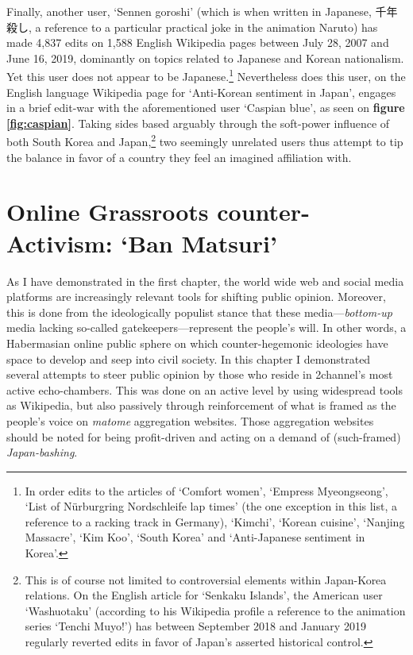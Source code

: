 \documentclass[10pt,british,A4paper,,openany]{memoir}
\begin{document}
Finally, another user, `Sennen goroshi' (which is when written in
Japanese, 千年殺し, a reference to a particular practical joke in the
animation Naruto) has made 4,837 edits on 1,588 English Wikipedia pages
between July 28, 2007 and June 16, 2019, dominantly on topics related to
Japanese and Korean nationalism. Yet this user does not appear to be
Japanese.\footnote{In order edits to the articles of `Comfort women',
  `Empress Myeongseong', `List of Nürburgring Nordschleife lap times'
  (the one exception in this list, a reference to a racking track in
  Germany), `Kimchi', `Korean cuisine', `Nanjing Massacre', `Kim Koo',
  `South Korea' and `Anti-Japanese sentiment in Korea'.} Nevertheless
does this user, on the English language Wikipedia page for `Anti-Korean
sentiment in Japan', engages in a brief edit-war with the aforementioned
user `Caspian blue', as seen on \textbf{figure \ref{fig:caspian}}.
Taking sides based arguably through the soft-power influence of both
South Korea and Japan,\footnote{This is of course not limited to
  controversial elements within Japan-Korea relations. On the English
  article for `Senkaku Islands', the American user `Washuotaku'
  (according to his Wikipedia profile a reference to the animation
  series `Tenchi Muyo!') has between September 2018 and January 2019
  regularly reverted edits in favor of Japan's asserted historical
  control.} two seemingly unrelated users thus attempt to tip the
balance in favor of a country they feel an imagined affiliation with.

\section{\texorpdfstring{Online Grassroots counter-Activism: `Ban
Matsuri'}{Online Grassroots counter-Activism: Ban Matsuri}}\label{online-grassroots-counter-activism-ban-matsuri}

As I have demonstrated in the first chapter, the world wide web and
social media platforms are increasingly relevant tools for shifting
public opinion. Moreover, this is done from the ideologically populist
stance that these media---\emph{bottom-up} media lacking so-called
gatekeepers---represent the people's will. In other words, a Habermasian
online public sphere on which counter-hegemonic ideologies have space to
develop and seep into civil society. In this chapter I demonstrated
several attempts to steer public opinion by those who reside in
2channel's most active echo-chambers. This was done on an active level
by using widespread tools as Wikipedia, but also passively through
reinforcement of what is framed as the people's voice on \emph{matome}
aggregation websites. Those aggregation websites should be noted for
being profit-driven and acting on a demand of (such-framed)
\emph{Japan-bashing}.
\end{document}
